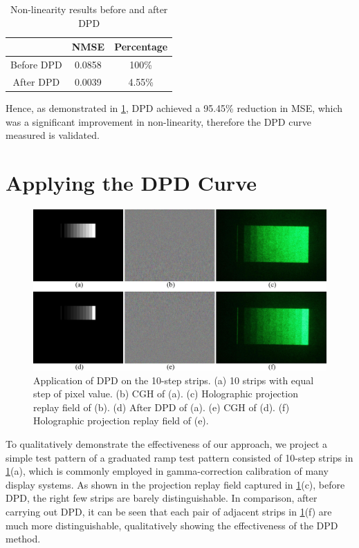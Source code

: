 \begin{table}[H]
    \begin{center}
        \begin{tabular}{|c|c|c|}
            \hline
                       & NMSE   & Percentage \\ \hline
            Before DPD & 0.0858 & 100\%      \\ \hline
            After DPD  & 0.0039 & 4.55\%     \\ \hline
        \end{tabular}
        \caption{Non-linearity results before and after DPD}
        \label{tab:non-linearity result}
    \end{center}
\end{table}

Hence, as demonstrated in \cref{tab:non-linearity result}, DPD achieved a 95.45\% reduction in MSE, which was a significant improvement in non-linearity, therefore the DPD curve measured is validated.




\section{Applying the DPD Curve}

\begin{figure}[H]
    \centering
    \includegraphics[width=\textwidth]{10_step_strips.jpg}
    \caption{Application of DPD on the 10-step strips. (a) 10 strips with equal step of pixel value. (b) CGH of (a). (c) Holographic projection replay field of (b). (d) After DPD of (a). (e) CGH of (d). (f) Holographic projection replay field of (e).}
    \label{fig:10_step_strips}
\end{figure}
\vspace{3mm}

To qualitatively demonstrate the effectiveness of our approach, we project a simple test pattern of a graduated ramp test pattern consisted of 10-step strips in \cref{fig:10_step_strips}(a), which is commonly employed in gamma-correction calibration of many display systems. As shown in the projection replay field captured in \cref{fig:10_step_strips}(c), before DPD, the right few strips are barely distinguishable. In comparison, after carrying out DPD, it can be seen that each pair of adjacent strips in \cref{fig:10_step_strips}(f) are much more distinguishable, qualitatively showing the effectiveness of the DPD method.

